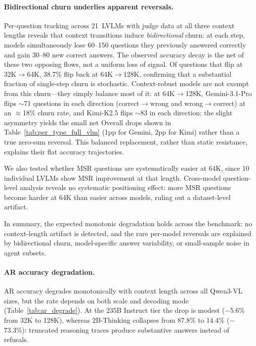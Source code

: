 \documentclass{article}
\begin{document}
\paragraph{Bidirectional churn underlies apparent reversals.}
Per-question tracking across 21~LVLMs with judge data at all three context lengths reveals that context transitions induce \emph{bidirectional} churn: at each step, models simultaneously lose 60--150 questions they previously answered correctly and gain 30--80 new correct answers.
The observed accuracy decay is the net of these two opposing flows, not a uniform loss of signal.
Of questions that flip at 32K$\to$64K, 38.7\% flip back at 64K$\to$128K, confirming that a substantial fraction of single-step churn is stochastic.
Context-robust models are not exempt from this churn---they simply balance most of it: at 64K$\to$128K, Gemini-3.1-Pro flips ${\sim}$71 questions in each direction (correct$\to$wrong and wrong$\to$correct) at an ${\approx}$18\% churn rate, and Kimi-K2.5 flips ${\sim}$83 in each direction; the slight asymmetry yields the small net Overall drops shown in Table~\ref{tab:per_type_full_vlm} (1pp for Gemini, 2pp for Kimi) rather than a true zero-sum reversal.
This balanced replacement, rather than static resistance, explains their flat accuracy trajectories.

We also tested whether MSR questions are systematically easier at 64K, since 10 individual LVLMs show MSR improvement at that length.
Cross-model question-level analysis reveals no systematic positioning effect: more MSR questions become harder at 64K than easier across models, ruling out a dataset-level artifact.

In summary, the expected monotonic degradation holds across the benchmark: no context-length artifact is detected, and the rare per-model reversals are explained by bidirectional churn, model-specific answer variability, or small-sample noise in agent subsets.



\paragraph{AR accuracy degradation.}
\label{app:ar_degrade}

AR accuracy degrades monotonically with context length across all Qwen3-VL sizes, but the rate depends on both scale and decoding mode (Table~\ref{tab:ar_degrade}). At the 235B Instruct tier the drop is modest ($-$5.6\% from 32K to 128K), whereas 2B-Thinking collapses from 87.8\% to 14.4\% ($-$73.3\%): truncated reasoning traces produce substantive answers instead of refusals.
\end{document}
